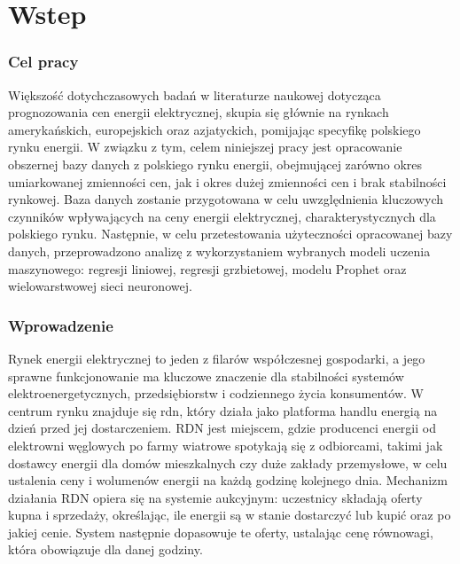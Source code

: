 \chapter{Wstep}

\subsection*{Cel pracy}
\label{ch:cel_pracy}

Większość dotychczasowych badań w literaturze naukowej dotycząca prognozowania cen energii elektrycznej, skupia się głównie na rynkach amerykańskich, europejskich oraz azjatyckich, pomijając specyfikę polskiego rynku energii. W związku z tym, celem niniejszej pracy jest opracowanie obszernej bazy danych z polskiego rynku energii, obejmującej zarówno okres umiarkowanej zmienności cen, jak i okres dużej zmienności cen i brak stabilności rynkowej. Baza danych zostanie przygotowana w celu uwzględnienia kluczowych czynników wpływających na ceny energii elektrycznej, charakterystycznych dla polskiego rynku. Następnie, w celu przetestowania użyteczności opracowanej bazy danych, przeprowadzono analizę z wykorzystaniem wybranych modeli uczenia maszynowego: regresji liniowej, regresji grzbietowej, modelu Prophet oraz wielowarstwowej sieci neuronowej.

\subsection*{Wprowadzenie}
\label{ch:wprowadzenie}
Rynek energii elektrycznej to jeden z filarów współczesnej gospodarki, a jego sprawne funkcjonowanie ma kluczowe znaczenie dla stabilności systemów elektroenergetycznych, przedsiębiorstw i codziennego życia konsumentów. W centrum rynku znajduje się \gls{rdn}, który działa jako platforma handlu energią na dzień przed jej dostarczeniem. RDN jest miejscem, gdzie producenci energii od elektrowni węglowych po farmy wiatrowe spotykają się z odbiorcami, takimi jak dostawcy energii dla domów mieszkalnych czy duże zakłady przemysłowe, w celu ustalenia ceny i wolumenów energii na każdą godzinę kolejnego dnia. Mechanizm działania RDN opiera się na systemie aukcyjnym: uczestnicy składają oferty kupna i sprzedaży, określając, ile energii są w stanie dostarczyć lub kupić oraz po jakiej cenie. System następnie dopasowuje te oferty, ustalając cenę równowagi, która obowiązuje dla danej godziny.

